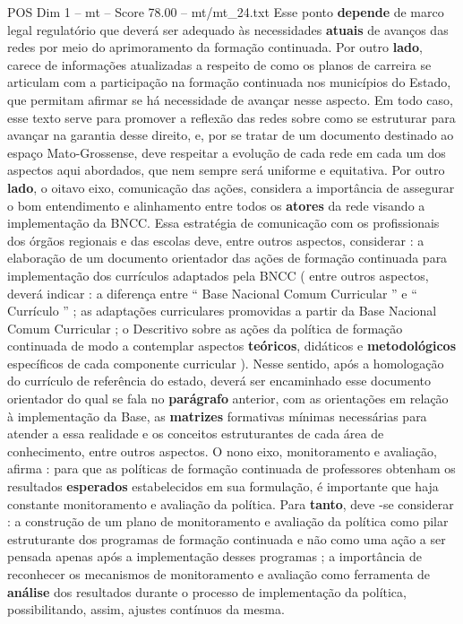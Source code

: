 \begin{textsample}{POS Dim 1 – mt – Score 78.00 – mt/mt\_24.txt}
Esse ponto \textbf{depende} de marco legal regulatório que deverá ser adequado às necessidades \textbf{atuais} de avanços das redes por meio do aprimoramento da formação continuada.
Por outro \textbf{lado}, carece de informações atualizadas a respeito de como os planos de carreira se articulam com a participação na formação continuada nos municípios do Estado, que permitam afirmar se há necessidade de avançar nesse aspecto.
Em todo caso, esse texto serve para promover a reflexão das redes sobre como se estruturar para avançar na garantia desse direito, e, por se tratar de um documento destinado ao espaço Mato-Grossense, deve respeitar a evolução de cada rede em cada um dos aspectos aqui abordados, que nem sempre será uniforme e equitativa.
Por outro \textbf{lado}, o oitavo eixo, comunicação das ações, considera a importância de assegurar o bom entendimento e alinhamento entre todos os \textbf{atores} da rede visando a implementação da BNCC.
Essa estratégia de comunicação com os profissionais dos órgãos regionais e das escolas deve, entre outros aspectos, considerar : a elaboração de um documento orientador das ações de formação continuada para implementação dos currículos adaptados pela BNCC ( entre outros aspectos, deverá indicar : a diferença entre “ Base Nacional Comum Curricular ” e “ Currículo ” ; as adaptações curriculares promovidas a partir da Base Nacional Comum Curricular ; o Descritivo sobre as ações da política de formação continuada de modo a contemplar aspectos \textbf{teóricos}, didáticos e \textbf{metodológicos} específicos de cada componente curricular ).
Nesse sentido, após a homologação do currículo de referência do estado, deverá ser encaminhado esse documento orientador do qual se fala no \textbf{parágrafo} anterior, com as orientações em relação à implementação da Base, as \textbf{matrizes} formativas mínimas necessárias para atender a essa realidade e os conceitos estruturantes de cada área de conhecimento, entre outros aspectos.
O nono eixo, monitoramento e avaliação, afirma : para que as políticas de formação continuada de professores obtenham os resultados \textbf{esperados} estabelecidos em sua formulação, é importante que haja constante monitoramento e avaliação da política.
Para \textbf{tanto}, deve -se considerar : a construção de um plano de monitoramento e avaliação da política como pilar estruturante dos programas de formação continuada e não como uma ação a ser pensada apenas após a implementação desses programas ; a importância de reconhecer os mecanismos de monitoramento e avaliação como ferramenta de \textbf{análise} dos resultados durante o processo de implementação da política, possibilitando, assim, ajustes contínuos da mesma.

\end{textsample}
